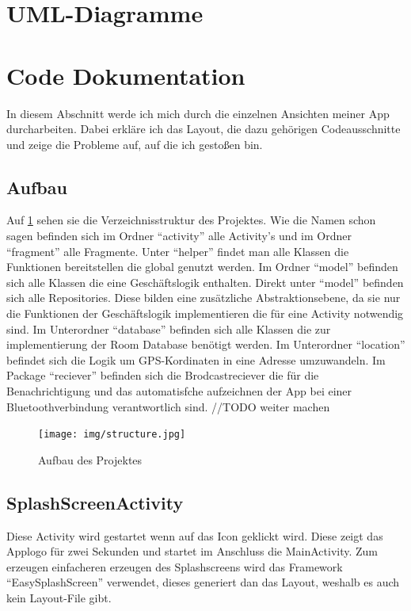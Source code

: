 \documentclass[a4paper]{article}
\begin{document}
\section{UML-Diagramme}

\section{Code Dokumentation}
In diesem Abschnitt werde ich mich durch die einzelnen Ansichten meiner App durcharbeiten. Dabei erkläre ich das Layout,
die dazu gehörigen Codeausschnitte und zeige die Probleme auf, auf die ich gestoßen bin.

\subsection{Aufbau}
Auf \ref{img:img/structure.jpg} sehen sie die Verzeichnisstruktur des Projektes. Wie die Namen schon sagen befinden sich im Ordner \enquote{activity} 
alle Activity's und im Ordner \enquote{fragment} alle Fragmente. Unter \enquote{helper} findet man alle Klassen die Funktionen bereitstellen die global 
genutzt werden. Im Ordner \enquote{model} befinden sich alle Klassen die eine Geschäftslogik enthalten. Direkt unter  \enquote{model} befinden sich alle Repositories.
Diese bilden eine zusätzliche Abstraktionsebene, da sie nur die Funktionen der Geschäftslogik implementieren die für eine Activity notwendig sind. Im Unterordner
\enquote{database} befinden sich alle Klassen die zur implementierung der Room Database benötigt werden. Im Unterordner \enquote{location} befindet sich die Logik um
GPS-Kordinaten in eine Adresse umzuwandeln. Im Package \enquote{reciever} befinden sich die Brodcastreciever die für die Benachrichtigung und das automatisfche aufzeichnen 
der App bei einer Bluetoothverbindung verantwortlich sind. //TODO weiter machen

\begin{figure}[H]
    \begin{center}
        \texttt{[image: img/structure.jpg]}
        \caption{\label{img:img/structure.jpg}Aufbau des Projektes}
    \end{center}
\end{figure}

\subsection{SplashScreenActivity}
Diese Activity wird gestartet wenn auf das Icon geklickt wird.
Diese zeigt das Applogo für zwei Sekunden und startet im Anschluss die MainActivity.
Zum erzeugen einfacheren erzeugen des Splashscreens wird das Framework \enquote{EasySplashScreen} verwendet,
dieses generiert dan das Layout, weshalb es auch kein Layout-File gibt.
\end{document}
